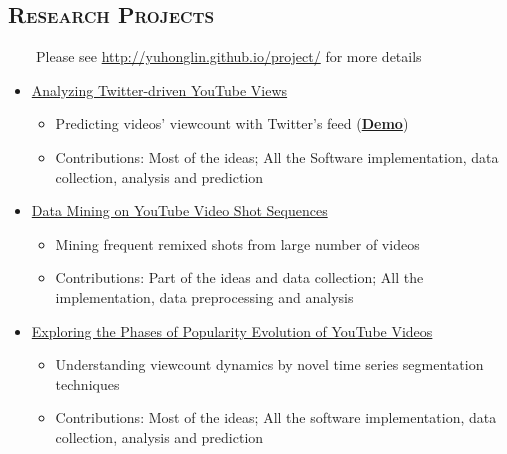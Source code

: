 \begin{resume}
\section{\textsc{Research Projects}}
\ \ \ \  Please see \href{http://yuhonglin.github.io/project/}{http://yuhonglin.github.io/project/} for more details \\
\begin{itemize}
\item \href{http://yuhonglin.github.io/2013/10/02/youtube-and-twitter.html}{Analyzing Twitter-driven YouTube Views}
  \begin{itemize}
  \item Predicting videos' viewcount with Twitter's feed (\href{http://cantabile.anu.edu.au/yt/demo/}{\bf Demo})
  \item Contributions: Most of the ideas; All the Software implementation, data collection, analysis and prediction
  \end{itemize}
\item \href{http://yuhonglin.github.io/2014/08/31/visual-meme-sequence-analysis.html}{Data Mining on YouTube Video Shot Sequences}
  \begin{itemize}
  \item Mining frequent remixed shots from large number of videos
  \item Contributions: Part of the ideas and data collection; All the implementation, data preprocessing and analysis
  \end{itemize}
\item \href{http://yuhonglin.github.io/2012/10/04/viewcount-phase.html}{Exploring the Phases of Popularity Evolution of YouTube Videos}
  \begin{itemize}
  \item Understanding viewcount dynamics by novel time series segmentation techniques
  \item Contributions: Most of the ideas; All the software implementation, data collection, analysis and prediction
  \end{itemize}    
\end{itemize}

\begin{formatb}
  \\
  \body\\
\end{formatb}


\end{resume}
